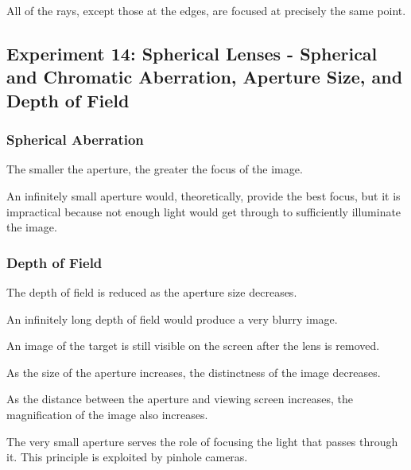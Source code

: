 \documentclass[12pt]{article}
\begin{document}
\subsubsubsection{}

All of the rays, except those at the edges, are focused at precisely the same
point.



\subsection{Experiment 14: Spherical Lenses - Spherical and Chromatic
  Aberration, Aperture Size, and Depth of Field}

\subsubsection{Spherical Aberration}

\subsubsubsection{}

The smaller the aperture, the greater the focus of the image.

\subsubsubsection{}

An infinitely small aperture would, theoretically, provide the best focus, but
it is impractical because not enough light would get through to sufficiently
illuminate the image.

\subsubsection{Depth of Field}

\subsubsubsection{}

The depth of field is reduced as the aperture size decreases.

\subsubsubsection{}

An infinitely long depth of field would produce a very blurry image.

\subsubsubsection{}

An image of the target is still visible on the screen after the lens is removed.

\subsubsubsection{}

As the size of the aperture increases, the distinctness of the image decreases.

\subsubsubsection{}

As the distance between the aperture and viewing screen increases, the
magnification of the image also increases.

\subsubsubsection{}

The very small aperture serves the role of focusing the light that passes
through it. This principle is exploited by pinhole cameras.
\end{document}
